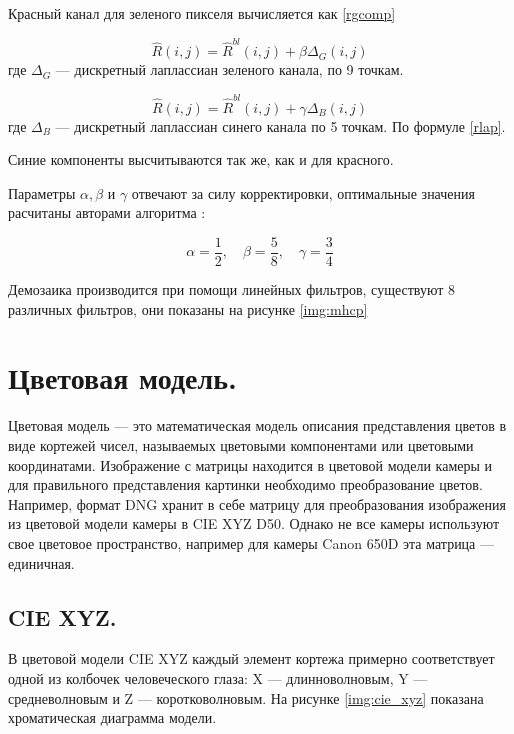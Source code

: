 Красный канал для зеленого пикселя вычисляется как \ref{rgcomp}

\begin{equation}
	\label{rgcomp}
	\hat{R}(i,j) = \hat{R}^{bl}(i,j) + \beta\Delta_{G}(i,j) 
\end{equation}
где $\Delta_{G}$ --- дискретный лаплассиан зеленого канала, по 9 точкам.

\begin{equation}
	\label{rbcomp}
	\hat{R}(i,j) = \hat{R}^{bl}(i,j) + \gamma\Delta_{B}(i,j) 
\end{equation}
где $\Delta_{B}$ --- дискретный лаплассиан синего канала по 5 точкам. По формуле \ref{rlap}.

Синие компоненты высчитываются так же, как и для красного.

Параметры $\alpha, \beta$ и $\gamma$ отвечают за силу корректировки, оптимальные значения расчитаны авторами алгоритма \cite{mhcd}:

\begin{equation}
	\alpha = \frac{1}{2}, \quad \beta = \frac{5}{8}, \quad \gamma = \frac{3}{4}
\end{equation}

Демозаика производится при помощи линейных фильтров, существуют 8 различных фильтров, они показаны на рисунке \ref{img:mhcp}

\newpage



\section{Цветовая модель.}
Цветовая модель --- это математическая модель описания представления цветов в виде кортежей чисел, называемых цветовыми компонентами или цветовыми координатами. Изображение с матрицы находится в цветовой модели камеры и для правильного представления картинки необходимо преобразование цветов. Например, формат DNG хранит в себе матрицу для преобразования изображения из цветовой модели камеры в CIE XYZ D50. Однако не все камеры используют свое цветовое пространство, например для камеры Canon 650D эта матрица --- единичная.

\subsection{CIE XYZ.}
В цветовой модели CIE XYZ каждый элемент кортежа примерно соответствует одной из колбочек человеческого глаза: X --- длинноволновым, Y --- средневолновым и Z --- коротковолновым. На рисунке \ref{img:cie_xyz} показана хроматическая диаграмма модели.

